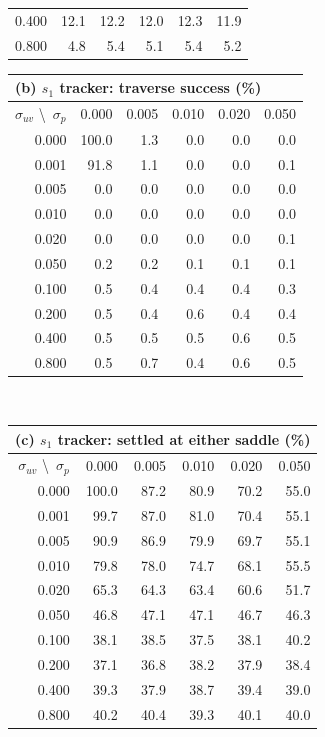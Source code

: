 \documentclass[lettersize,journal]{IEEEtran}
\begin{document}
\begin{table}[!t]
\begin{tabular}{r|rrrrr}
0.400 &  12.1 & 12.2 & 12.0 & 12.3 & 11.9 \\
0.800 &   4.8 &  5.4 &  5.1 &  5.4 &  5.2 \\
\hline
\end{tabular}
\hspace{1.5em}
\begin{tabular}{r|rrrrr}
\multicolumn{6}{l}{(b) $s_1$ tracker: traverse success (\%)} \\
\hline
$\sigma_{uv}$ \textbackslash\ $\sigma_p$ & 0.000 & 0.005 & 0.010 & 0.020 & 0.050 \\
\hline
0.000 & 100.0 &  1.3 &  0.0 &  0.0 &  0.0 \\
0.001 &  91.8 &  1.1 &  0.0 &  0.0 &  0.1 \\
0.005 &   0.0 &  0.0 &  0.0 &  0.0 &  0.0 \\
0.010 &   0.0 &  0.0 &  0.0 &  0.0 &  0.0 \\
0.020 &   0.0 &  0.0 &  0.0 &  0.0 &  0.1 \\
0.050 &   0.2 &  0.2 &  0.1 &  0.1 &  0.1 \\
0.100 &   0.5 &  0.4 &  0.4 &  0.4 &  0.3 \\
0.200 &   0.5 &  0.4 &  0.6 &  0.4 &  0.4 \\
0.400 &   0.5 &  0.5 &  0.5 &  0.6 &  0.5 \\
0.800 &   0.5 &  0.7 &  0.4 &  0.6 &  0.5 \\
\hline
\end{tabular}
\\[4pt]
\begin{tabular}{r|rrrrr}
\multicolumn{6}{l}{(c) $s_1$ tracker: settled at either saddle (\%)} \\
\hline
$\sigma_{uv}$ \textbackslash\ $\sigma_p$ & 0.000 & 0.005 & 0.010 & 0.020 & 0.050 \\
\hline
0.000 & 100.0 & 87.2 & 80.9 & 70.2 & 55.0 \\
0.001 &  99.7 & 87.0 & 81.0 & 70.4 & 55.1 \\
0.005 &  90.9 & 86.9 & 79.9 & 69.7 & 55.1 \\
0.010 &  79.8 & 78.0 & 74.7 & 68.1 & 55.5 \\
0.020 &  65.3 & 64.3 & 63.4 & 60.6 & 51.7 \\
0.050 &  46.8 & 47.1 & 47.1 & 46.7 & 46.3 \\
0.100 &  38.1 & 38.5 & 37.5 & 38.1 & 40.2 \\
0.200 &  37.1 & 36.8 & 38.2 & 37.9 & 38.4 \\
0.400 &  39.3 & 37.9 & 38.7 & 39.4 & 39.0 \\
0.800 &  40.2 & 40.4 & 39.3 & 40.1 & 40.0 \\
\hline
\end{tabular}
\end{table}
\end{document}
